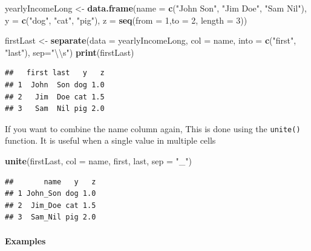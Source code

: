 \documentclass[]{article}
\newenvironment{Shaded}{\begin{snugshade}}{\end{snugshade}}
\newcommand{\KeywordTok}[1]{\textcolor[rgb]{0.13,0.29,0.53}{\textbf{#1}}}
\newcommand{\DataTypeTok}[1]{\textcolor[rgb]{0.13,0.29,0.53}{#1}}
\newcommand{\DecValTok}[1]{\textcolor[rgb]{0.00,0.00,0.81}{#1}}
\newcommand{\CharTok}[1]{\textcolor[rgb]{0.31,0.60,0.02}{#1}}
\newcommand{\StringTok}[1]{\textcolor[rgb]{0.31,0.60,0.02}{#1}}
\newcommand{\NormalTok}[1]{#1}
\let\oldparagraph\paragraph
\renewcommand{\paragraph}[1]{\oldparagraph{#1}\mbox{}}
\begin{document}
\begin{Shaded}
\begin{Highlighting}[]
\NormalTok{yearlyIncomeLong <-}\StringTok{ }\KeywordTok{data.frame}\NormalTok{(}\DataTypeTok{name =} \KeywordTok{c}\NormalTok{(}\StringTok{"John Son"}\NormalTok{, }\StringTok{"Jim Doe"}\NormalTok{, }\StringTok{"Sam Nil"}\NormalTok{), }\DataTypeTok{y =} \KeywordTok{c}\NormalTok{(}\StringTok{"dog"}\NormalTok{, }\StringTok{"cat"}\NormalTok{, }\StringTok{"pig"}\NormalTok{), }\DataTypeTok{z =} \KeywordTok{seq}\NormalTok{(}\DataTypeTok{from =} \DecValTok{1}\NormalTok{,}\DataTypeTok{to =} \DecValTok{2}\NormalTok{, }\DataTypeTok{length =} \DecValTok{3}\NormalTok{))}

\NormalTok{firstLast <-}\StringTok{ }\KeywordTok{separate}\NormalTok{(}\DataTypeTok{data =}\NormalTok{ yearlyIncomeLong, }\DataTypeTok{col =}\NormalTok{ name, }\DataTypeTok{into =} \KeywordTok{c}\NormalTok{(}\StringTok{"first"}\NormalTok{, }\StringTok{"last"}\NormalTok{), }\DataTypeTok{sep=}\StringTok{"}\CharTok{\textbackslash{}\textbackslash{}}\StringTok{s"}\NormalTok{)}
\KeywordTok{print}\NormalTok{(firstLast)}
\end{Highlighting}
\end{Shaded}

\begin{verbatim}
##   first last   y   z
## 1  John  Son dog 1.0
## 2   Jim  Doe cat 1.5
## 3   Sam  Nil pig 2.0
\end{verbatim}

If you want to combine the name column again, This is done using the
\texttt{unite()} function. It is useful when a single value in multiple
cells

\begin{Shaded}
\begin{Highlighting}[]
\KeywordTok{unite}\NormalTok{(firstLast, }\DataTypeTok{col =}\NormalTok{ name, first, last, }\DataTypeTok{sep =} \StringTok{"_"}\NormalTok{)}
\end{Highlighting}
\end{Shaded}

\begin{verbatim}
##       name   y   z
## 1 John_Son dog 1.0
## 2  Jim_Doe cat 1.5
## 3  Sam_Nil pig 2.0
\end{verbatim}

\paragraph{Examples}\label{examples-1}
\end{document}
